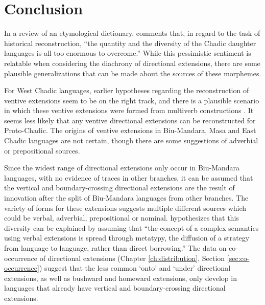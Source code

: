 \section{Conclusion}

In a review of an etymological dictionary, \citet{takacsReviewArticlesFirst2017} comments that, in regard to the task of historical reconstruction, ``the quantity and the diversity of the Chadic daughter languages is all too enormous to overcome.'' While this pessimistic sentiment is relatable when considering the diachrony of directional extensions, there are some plausible generalizations that can be made about the sources of these morphemes. 

For West Chadic languages, earlier hypotheses regarding the reconstruction of ventive extensions seem to be on the right track, and there is a plausible scenario in which these ventive extensions were formed from multiverb constructions \citep{frajzyngierVentiveCentrifugalChadic1987}. It seems less likely that any ventive directional extensions can be reconstructed for Proto-Chadic. The origins of ventive extensions in Biu-Mandara, Masa and East Chadic languages are not certain, though there are some suggestions of adverbial or prepositional sources. 

Since the widest range of directional extensions only occur in Biu-Mandara languages, with no evidence of traces in other branches, it can be assumed that the vertical and boundary-crossing directional extensions are the result of innovation after the split of Biu-Mandara languages from other branches. The variety of forms for these extensions suggests multiple different sources which could be verbal, adverbial, prepositional or nominal. \citet[16]{blenchBuraVerbalExtensions2010} hypothesizes that this diversity can be explained by assuming that ``the concept of a complex semantics using verbal extensions is spread through metatypy, the diffusion of a strategy from language to language, rather than direct borrowing.'' The data on co-occurrence of directional extensions (Chapter \ref{ch:distribution}, Section \ref{sec:co-occurrence}) suggest that the less common `onto' and `under' directional extensions, as well as bushward and homeward extensions, only develop in languages that already have vertical and boundary-crossing directional extensions. 

